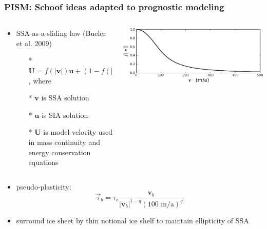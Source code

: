 \documentclass{beamer}
\begin{document}
\begin{frame}
  \frametitle{PISM: Schoof ideas adapted to prognostic modeling}

\begin{columns}
\begin{column}{0.6\textwidth}

\begin{itemize}
\item SSA-as-a-sliding law \scriptsize (Bueler et al. 2009) \normalsize
  \begin{itemize}
  \item[*] $\mathbf{U} = f(|\mathbf{v}|) \mathbf{u} + \left(1-f(|\mathbf{v}|)\right) \mathbf{v}$, where
  \item[*] $\mathbf{v}$ is SSA solution
  \item[*] $\mathbf{u}$ is SIA solution
  \item[*] $\mathbf{U}$ is model velocity used in mass continuity and energy conservation equations
  \end{itemize}

\end{itemize}
\end{column}

\begin{column}{0.4\textwidth}
\includegraphics[width=1.0\textwidth]{fofv}
\end{column}
\end{columns}

\begin{itemize}
\item pseudo-plasticity:
	$$\vec \tau_b = \tau_c \frac{\mathbf{v}_b}{|\mathbf{v}_b|^{1-q} (100 \text{ m/a})^q}$$
\item surround ice sheet by thin notional ice shelf to maintain ellipticity of SSA
\end{itemize}
\end{frame}
\end{document}
